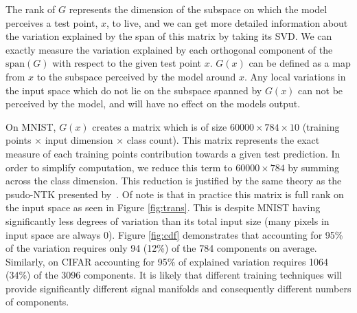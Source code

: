 The rank of $G$ represents the dimension of the subspace on which the model perceives a test point, $x$, to live, and we can get more detailed information about the variation explained by the span of this matrix by taking its SVD. We can exactly measure the variation explained by each orthogonal component of the $\text{span}(G)$ with respect to the given test point $x$. $G(x)$ can be defined as a map from $x$ to the subspace perceived by the model around $x$. Any local variations in the input space which do not lie on the subspace spanned by $G(x)$ can not be perceived by the model, and will have no effect on the models output.

On MNIST, $G(x)$ creates a matrix which is of size $60000 \times 784 \times 10$ (training points $\times$ input dimension $\times$ class count).
This matrix represents the exact measure of each training points contribution towards a given test prediction.
In order to simplify computation, we reduce this term to $60000 \times 784$ by summing across the class dimension.
This reduction is justified by the same theory as the psudo-NTK presented by~\citet{pmlr-v202-mohamadi23a}.
Of note is that in practice this matrix is full rank on the input space as seen in Figure \ref{fig:trans}.
This is despite MNIST having significantly less degrees of variation than its total input size (many pixels in input space are always 0).
Figure \ref{fig:cdf} demonstrates that accounting for 95\% of the variation requires only 94 (12\%) of the 784 components on average.
Similarly, on CIFAR accounting for 95\% of explained variation requires 1064 (34\%) of the 3096 components.
It is likely that different training techniques will provide significantly different signal manifolds and consequently different numbers of components.
